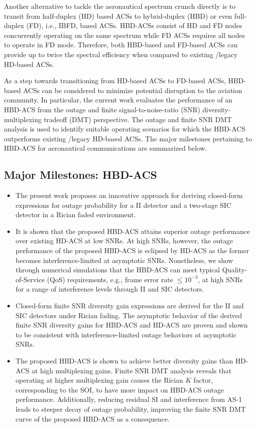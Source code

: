 Another alternative to tackle the aeronautical spectrum crunch directly is to transit from half-duplex (HD) based ACSs to hybrid-duplex (HBD) or even full-duplex (FD), i.e., IBFD, based ACSs. HBD-ACSs consist of HD and FD nodes concurrently operating on the same spectrum while FD ACSs requires all nodes to operate in FD mode. Therefore, both HBD-based and FD-based ACSs can provide up to twice the spectral efficiency when compared to existing /legacy HD-based ACSs.

As a step towards transitioning from HD-based ACSs to FD-based ACSs, HBD-based ACSs can be considered to minimize potential disruption to the aviation community. In particular, the current work evaluates the performance of an HBD-ACS from the outage and finite signal-to-noise-ratio (SNR) diversity-multiplexing tradeoff (DMT) perspective. The outage and finite SNR DMT analysis is used to identify suitable operating scenarios for which the HBD-ACS outperforms existing /legacy HD-based ACSs. The major milestones pertaining to HBD-ACS for aeronautical communications are summarized below.

\subsection{Major Milestones: HBD-ACS}
\begin{itemize}
	\item The present work proposes an innovative approach for deriving closed-form expressions for outage probability for a II detector and a two-stage SIC detector in a Rician faded environment.
	\item It is shown that the proposed HBD-ACS attains superior outage performance over existing HD-ACS at low SNRs. At high SNRs, however, the outage performance of the proposed HBD-ACS is eclipsed by HD-ACS as the former becomes interference-limited at asymptotic SNRs. Nonetheless, we show through numerical simulations that the HBD-ACS can meet typical Quality-of-Service (QoS) requirements, e.g., frame error rate $\leq 10^{-3}$, at high SNRs for a range of interference levels through II and SIC detectors. 
	\item Closed-form finite SNR diversity gain expressions are derived for the II and SIC detectors under Rician fading. The asymptotic behavior of the derived finite SNR diversity gains for HBD-ACS and HD-ACS are proven and shown to be consistent with interference-limited outage behaviors at asymptotic SNRs.
	\item The proposed HBD-ACS is shown to achieve better diversity gains than HD-ACS at high multiplexing gains. Finite SNR DMT analysis reveals that operating at higher multiplexing gain causes the Rician $K$ factor, corresponding to the SOI, to have more impact on HBD-ACS outage performance. Additionally, reducing residual SI and interference from AS-1 leads to steeper decay of outage probability, improving the finite SNR DMT curve of the proposed HBD-ACS as a consequence.
\end{itemize}
 
